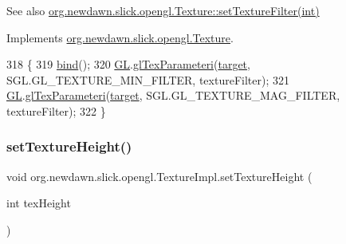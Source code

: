 \begin{DoxySeeAlso}{See also}
\mbox{\hyperlink{interfaceorg_1_1newdawn_1_1slick_1_1opengl_1_1_texture_ad55f0e2e39587c24e3e1b149ac8b16db}{org.\+newdawn.\+slick.\+opengl.\+Texture\+::set\+Texture\+Filter(int)}} 
\end{DoxySeeAlso}


Implements \mbox{\hyperlink{interfaceorg_1_1newdawn_1_1slick_1_1opengl_1_1_texture_ad55f0e2e39587c24e3e1b149ac8b16db}{org.\+newdawn.\+slick.\+opengl.\+Texture}}.


\begin{DoxyCode}
318                                                     \{
319         \mbox{\hyperlink{classorg_1_1newdawn_1_1slick_1_1opengl_1_1_texture_impl_a181498048d34fa8da8a86613d524f68e}{bind}}();
320         \mbox{\hyperlink{classorg_1_1newdawn_1_1slick_1_1opengl_1_1_texture_impl_ad672b5a41ba59c882980c429c09b6572}{GL}}.\mbox{\hyperlink{interfaceorg_1_1newdawn_1_1slick_1_1opengl_1_1renderer_1_1_s_g_l_a99abf6a580aac95c599916a61a4933d4}{glTexParameteri}}(\mbox{\hyperlink{classorg_1_1newdawn_1_1slick_1_1opengl_1_1_texture_impl_a5809d68afec3342e54fc4520f04a596a}{target}}, SGL.GL\_TEXTURE\_MIN\_FILTER, textureFilter); 
321         \mbox{\hyperlink{classorg_1_1newdawn_1_1slick_1_1opengl_1_1_texture_impl_ad672b5a41ba59c882980c429c09b6572}{GL}}.\mbox{\hyperlink{interfaceorg_1_1newdawn_1_1slick_1_1opengl_1_1renderer_1_1_s_g_l_a99abf6a580aac95c599916a61a4933d4}{glTexParameteri}}(\mbox{\hyperlink{classorg_1_1newdawn_1_1slick_1_1opengl_1_1_texture_impl_a5809d68afec3342e54fc4520f04a596a}{target}}, SGL.GL\_TEXTURE\_MAG\_FILTER, textureFilter); 
322     \}
\end{DoxyCode}
\mbox{\label{classorg_1_1newdawn_1_1slick_1_1opengl_1_1_texture_impl_a8bb618172f32293f476c63e9ae393b44}} 
\subsubsection{\texorpdfstring{set\+Texture\+Height()}{setTextureHeight()}}
{\footnotesize\ttfamily void org.\+newdawn.\+slick.\+opengl.\+Texture\+Impl.\+set\+Texture\+Height (\begin{DoxyParamCaption}\item[{int}]{tex\+Height }\end{DoxyParamCaption})\hspace{0.3cm}{\ttfamily [inline]}}

